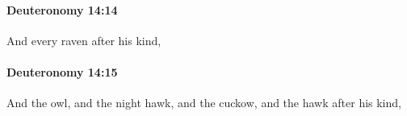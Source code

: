 		\paragraph{Deuteronomy 14:14} %
			\label{DEUTERONOMY-14-14}

			And every raven after his kind,


		\paragraph{Deuteronomy 14:15} %
			\label{DEUTERONOMY-14-15}

			And the owl, and the night hawk, and the cuckow, and the hawk after his kind,



